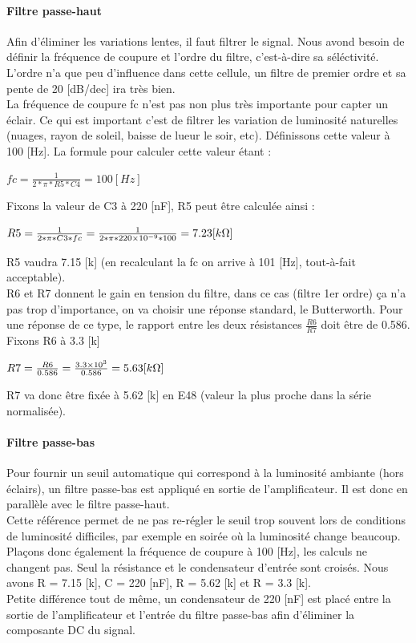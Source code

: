 \documentclass[a4paper,10pt]{article}
\begin{document}
\paragraph{Filtre passe-haut}
Afin d'éliminer les variations lentes, il faut filtrer le signal. Nous avond besoin de définir la fréquence de coupure et l'ordre du filtre, c'est-à-dire sa séléctivité. \\
L'ordre n'a que peu d'influence dans cette cellule, un filtre de premier ordre et sa pente de 20 [dB/dec] ira très bien. \\
La fréquence de coupure fc n'est pas non plus très importante pour capter un éclair. Ce qui est important c'est de filtrer les variation de luminosité naturelles (nuages, rayon de soleil, baisse de lueur le soir, etc). Définissons cette valeur à 100 [Hz]. La formule pour calculer cette valeur étant :
\begin{center}
 $ fc = \frac{1}{2*\pi*R5*C4} = 100 [Hz] $
\end{center}
Fixons la valeur de C3 à 220 [nF], R5 peut être calculée ainsi :
\begin{center}
 $ R5 = \frac{1}{2*\pi*C3*fc} = \frac{1}{2*\pi*\num{220e-9}*100} = 7.23 [k\ohm] $
\end{center}
R5 vaudra 7.15 [k\ohm] (en recalculant la fc on arrive à 101 [Hz], tout-à-fait acceptable). \\
R6 et R7 donnent le gain en tension du filtre, dans ce cas (filtre 1er ordre) ça n'a pas trop d'importance, on va choisir une réponse standard, le Butterworth. Pour une réponse de ce type, le rapport entre les deux résistances $ \frac{R6}{R7} $ doit être de 0.586. Fixons R6 à 3.3 [k\ohm]
\begin{center}
 $ R7 = \frac{R6}{0.586} = \frac{\num{3.3e3}}{0.586} = 5.63 [k\ohm] $
\end{center}
R7 va donc être fixée à 5.62 [k\ohm] en E48 (valeur la plus proche dans la série normalisée).

\paragraph{Filtre passe-bas}
Pour fournir un seuil automatique qui correspond à la luminosité ambiante (hors éclairs), un filtre passe-bas est appliqué en sortie de l'amplificateur. Il est donc en parallèle avec le filtre passe-haut. \\
Cette référence permet de ne pas re-régler le seuil trop souvent lors de conditions de luminosité difficiles, par exemple en soirée où la luminosité change beaucoup. \\
Plaçons donc également la fréquence de coupure à 100 [Hz], les calculs ne changent pas. Seul la résistance et le condensateur d'entrée sont croisés. Nous avons R = 7.15 [k\ohm], C = 220 [nF], R = 5.62 [k\ohm] et R = 3.3 [k\ohm].\\
Petite différence tout de même, un condensateur de 220 [nF] est placé entre la sortie de l'amplificateur et l'entrée du filtre passe-bas afin d'éliminer la composante DC du signal.
\end{document}
